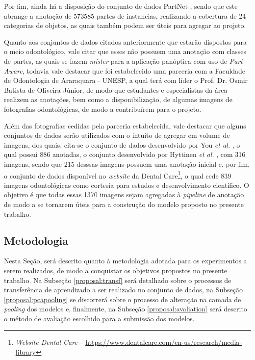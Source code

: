 Por fim, ainda há a disposição do conjunto de dados PartNet \cite{mo2019}, sendo que este abrange a anotação de 573585 partes de instancias, realizando a cobertura de 24 categorias de objetos, as quais também podem ser úteis para agregar ao projeto.

Quanto aos conjuntos de dados citados anteriormente que estarão dispostos para o meio odontológico, vale citar que esses não possuem uma anotação com classes de partes, as quais se fazem \textit{mister} para a aplicação panóptica com uso de \textit{Part-Aware}, todavia vale destacar que foi estabelecido uma parceria com a Faculdade de Odontologia de Araraquara - UNESP, a qual terá com líder o Prof. Dr. Osmir Batista de Oliveira Júnior, de modo que estudantes e especialistas da área realizem as anotações, bem como a disponibilização, de algumas imagens de fotografias odontológicas, de modo a contribuírem para o projeto.

Além das fotografias cedidas pela parceria estabelecida, vale destacar que alguns conjuntos de dados serão utilizados com o intuito de agregar em volume de imagens, dos quais, cita-se o conjunto de dados desenvolvido por You \textit{et al.} \cite{You2020}, o qual possui 886 anotadas, o conjunto desenvolvido por Hyttinen \textit{et al.} \cite{Hyttinen2020}, com 316 imagens, sendo que 215 desssas imagens possuem uma anotação inicial e, por fim, o conjunto de dados disponível no \textit{website} da Dental Care\footnote{\textit{Website Dental Care} – \url{https://www.dentalcare.com/en-us/research/media-library}}, o qual cede 839 imagens odontológicas como cortesia para estudos e desenvolvimento científico. O objetivo é que todas essas 1370 imagens sejam agregadas à \textit{pipeline} de anotação de modo a se tornarem úteis para a construção do modelo proposto no presente trabalho.

\subsection{Metodologia}
\label{proposal:methodology}
Nesta Seção, será descrito quanto à metodologia adotada para os experimentos a serem realizados, de modo a conquistar os objetivos propostos no presente trabalho. Na Subseção \ref{proposal:transf} será detalhado sobre o processos de transferência de aprendizado a ser realizado no conjunto de dados, na Subseção \ref{proposal:pcapooling} se discorrerá sobre o processo de alteração na camada de \textit{pooling} dos modelos e, finalmente, na Subseção \ref{proposal:avaliation} será descrito o método de avaliação escolhido para a submissão dos modelos.

